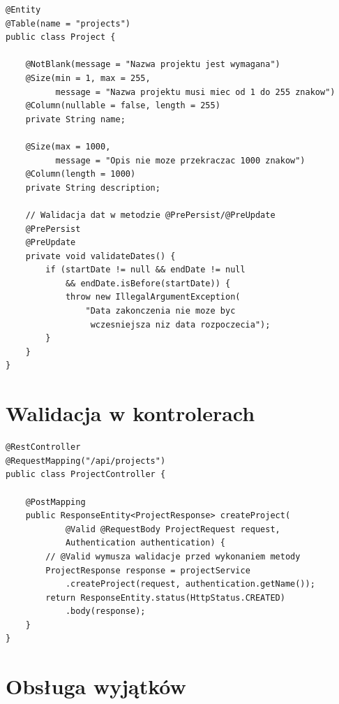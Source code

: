 \documentclass[12pt,a4paper]{report}
\begin{document}
\begin{lstlisting}[style=javastyle, caption={Walidacja w encji Project}]
@Entity
@Table(name = "projects")
public class Project {

    @NotBlank(message = "Nazwa projektu jest wymagana")
    @Size(min = 1, max = 255, 
          message = "Nazwa projektu musi miec od 1 do 255 znakow")
    @Column(nullable = false, length = 255)
    private String name;

    @Size(max = 1000, 
          message = "Opis nie moze przekraczac 1000 znakow")
    @Column(length = 1000)
    private String description;

    // Walidacja dat w metodzie @PrePersist/@PreUpdate
    @PrePersist
    @PreUpdate
    private void validateDates() {
        if (startDate != null && endDate != null 
            && endDate.isBefore(startDate)) {
            throw new IllegalArgumentException(
                "Data zakonczenia nie moze byc 
                 wczesniejsza niz data rozpoczecia");
        }
    }
}
\end{lstlisting}

\section{Walidacja w kontrolerach}

\begin{lstlisting}[style=javastyle, caption={Walidacja w kontrolerze z @Valid}]
@RestController
@RequestMapping("/api/projects")
public class ProjectController {

    @PostMapping
    public ResponseEntity<ProjectResponse> createProject(
            @Valid @RequestBody ProjectRequest request,
            Authentication authentication) {
        // @Valid wymusza walidacje przed wykonaniem metody
        ProjectResponse response = projectService
            .createProject(request, authentication.getName());
        return ResponseEntity.status(HttpStatus.CREATED)
            .body(response);
    }
}
\end{lstlisting}

\section{Obsługa wyjątków}
\end{document}
